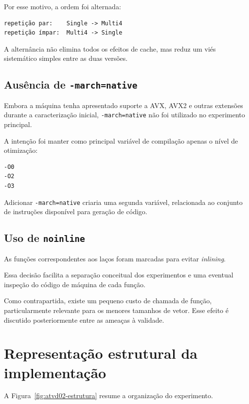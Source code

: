 Por esse motivo, a ordem foi alternada:

\begin{verbatim}
repetição par:    Single -> Multi4
repetição ímpar:  Multi4 -> Single
\end{verbatim}

A alternância não elimina todos os efeitos de cache, mas reduz um viés sistemático simples
entre as duas versões.


\subsection{Ausência de \texttt{-march=native}}

Embora a máquina tenha apresentado suporte a AVX, AVX2 e outras extensões durante a
caracterização inicial, \texttt{-march=native} não foi utilizado no experimento principal.

A intenção foi manter como principal variável de compilação apenas o nível de otimização:

\begin{verbatim}
-O0
-O2
-O3
\end{verbatim}

Adicionar \texttt{-march=native} criaria uma segunda variável, relacionada ao conjunto de
instruções disponível para geração de código.


\subsection{Uso de \texttt{noinline}}

As funções correspondentes aos laços foram marcadas para evitar \textit{inlining}.

Essa decisão facilita a separação conceitual dos experimentos e uma eventual inspeção do
código de máquina de cada função.

Como contrapartida, existe um pequeno custo de chamada de função, particularmente relevante
para os menores tamanhos de vetor. Esse efeito é discutido posteriormente entre as ameaças
à validade.


\section{Representação estrutural da implementação}

\label{sec:atvd02-estrutura}

A Figura~\ref{fig:atvd02-estrutura} resume a organização do experimento.

